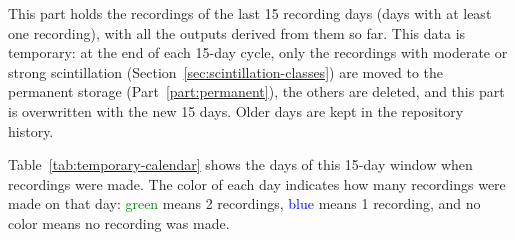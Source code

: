 \documentclass{article}
\begin{document}
This part holds the recordings of the last 15 recording days (days with at least one recording), with all the outputs derived from them so far. This data is temporary: at the end of each 15-day cycle, only the recordings with moderate or strong scintillation (Section~\ref{sec:scintillation-classes}) are moved to the permanent storage (Part~\ref{part:permanent}), the others are deleted, and this part is overwritten with the new 15 days. Older days are kept in the repository history.

Table~\ref{tab:temporary-calendar} shows the days of this 15-day window when recordings were made. The color of each day indicates how many recordings were made on that day: \textcolor{green}{green} means 2 recordings, \textcolor{blue}{blue} means 1 recording, and no color means no recording was made.
\end{document}
